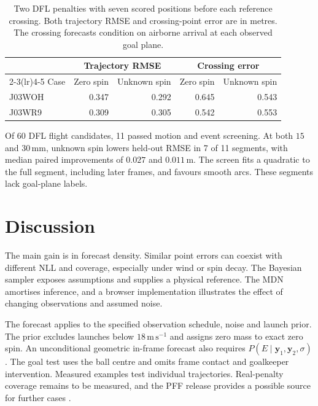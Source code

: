 \documentclass[11pt,a4paper]{article}
\begin{document}
\begin{table}[htbp]
  \centering
  \caption{Two DFL penalties with seven scored positions before each reference crossing. Both trajectory RMSE and crossing-point error are in metres. The crossing forecasts condition on airborne arrival at each observed goal plane.}
  \label{tab:dfl}
  \begin{tabular}{lrrrr}
    \toprule
    & \multicolumn{2}{c}{Trajectory RMSE} & \multicolumn{2}{c}{Crossing error} \\
    \cmidrule(lr){2-3}\cmidrule(lr){4-5}
    Case & Zero spin & Unknown spin & Zero spin & Unknown spin \\
    \midrule
    J03WOH & 0.347 & 0.292 & 0.645 & 0.543 \\
    J03WR9 & 0.309 & 0.305 & 0.542 & 0.553 \\
    \bottomrule
  \end{tabular}
\end{table}

Of 60 DFL flight candidates, 11 passed motion and event screening. At both $15$ and $30\,\mathrm{mm}$, unknown spin lowers held-out RMSE in 7 of 11 segments, with median paired improvements of $0.027$ and $0.011\,\mathrm{m}$. The screen fits a quadratic to the full segment, including later frames, and favours smooth arcs. These segments lack goal-plane labels.

\section{Discussion}

The main gain is in forecast density. Similar point errors can coexist with different NLL and coverage, especially under wind or spin decay. The Bayesian sampler exposes assumptions and supplies a physical reference. The MDN amortises inference, and a browser implementation illustrates the effect of changing observations and assumed noise.

The forecast applies to the specified observation schedule, noise and launch prior. The prior excludes launches below $18\,\mathrm{m\,s^{-1}}$ and assigns zero mass to exact zero spin. An unconditional geometric in-frame forecast also requires $P(E\mid\mathbf y_1,\mathbf y_2,\sigma)$. The goal test uses the ball centre and omits frame contact and goalkeeper intervention. Measured examples test individual trajectories. Real-penalty coverage remains to be measured, and the PFF release provides a possible source for further cases \cite{pff2022}.
\end{document}
